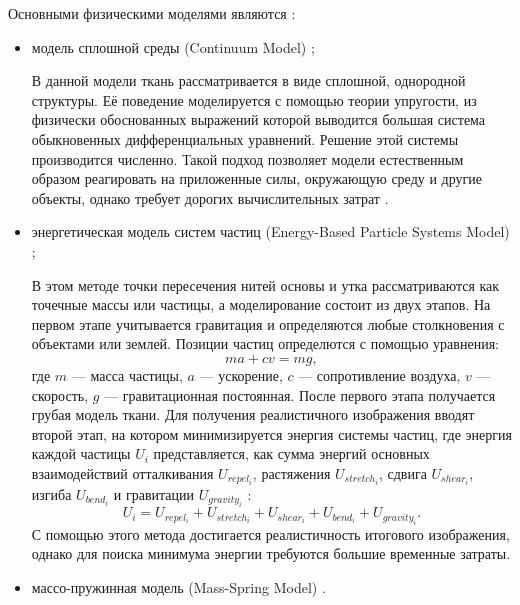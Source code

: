 Основными физическими моделями являются \cite{bib11}:
\begin{itemize}[left=\parindent]
    \item модель сплошной среды (Continuum Model) \cite{bib12};

        В данной модели ткань рассматривается в виде сплошной, однородной
        структуры. Её поведение моделируется с помощью теории упругости, из
        физически обоснованных выражений которой выводится большая система
        обыкновенных дифференциальных уравнений. Решение этой системы
        производится численно. Такой подход позволяет модели естественным
        образом реагировать на приложенные силы, окружающую среду и другие
        объекты, однако требует дорогих вычислительных затрат
        \cite{bib15}\cite{bib12}.

    \item энергетическая модель систем частиц (Energy-Based Particle Systems Model) \cite{bib13};

        В этом методе точки пересечения нитей основы и утка рассматриваются как
        точечные массы или частицы, а моделирование состоит из двух этапов. На
        первом этапе учитывается гравитация и  определяются любые столкновения
        с объектами или землей.  Позиции частиц определются с помощью
        уравнения:
        $$ma+cv=mg,$$
        где $m$ --- масса частицы, $a$ --- ускорение,
        $c$ --- сопротивление воздуха, $v$ --- скорость,
        $g$ --- гравитационная постоянная. После первого этапа получается
        грубая модель ткани. Для получения реалистичного изображения вводят
        второй этап, на котором минимизируется энергия системы частиц, где
        энергия каждой частицы $U_i$ представляется, как сумма энергий основных
        взаимодействий отталкивания $U_{repel_i}$, растяжения $U_{stretch_i}$,
        сдвига $U_{shear_i}$, изгиба $U_{bend_i}$ и гравитации $U_{gravity_i}$
        \cite{bib07}:
        $$U_i=U_{repel_i}+U_{stretch_i}+U_{shear_i}+U_{bend_i}+U_{gravity_i}.$$
        С помощью этого метода достигается реалистичность итогового
        изображения, однако для поиска минимума энергии требуются большие
        временные затраты\cite{bib11}.

    \item массо-пружинная модель (Mass-Spring Model) \cite{bib14}.


\end{itemize}
